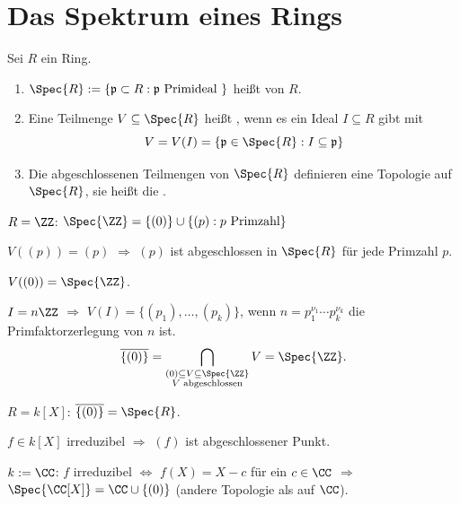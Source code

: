 \section{Das Spektrum eines Rings}

\begin{DefBem}
Sei $R$ ein Ring.

\begin{enumerate}
\item $\Spec{R} := \{ \mathfrak{p} \subset R : \mathfrak{p} \text{ Primideal } \}$ hei\ss t  von $R$.

\item Eine Teilmenge $V \subseteq \Spec{R}$ hei\ss t , wenn es ein Ideal $I \subseteq R$ gibt mit
$$V = V(I) = \{ \mathfrak{p} \in \Spec{R} : I \subseteq \mathfrak{p} \}$$

\item Die abgeschlossenen Teilmengen von $\Spec{R}$ definieren eine Topologie auf $\Spec{R}$, sie hei\ss t die .
\end{enumerate}
\end{DefBem}

\begin{nnBsp}
$R = \ZZ$: $\Spec{\ZZ} = \{ (0) \} \cup \{ (p) : p \text{ Primzahl} \}$

$V( (p) ) = (p)$ $\Rightarrow$ $(p)$ ist abgeschlossen in $\Spec{R}$ f\"ur jede Primzahl $p$.

$V( (0) ) = \Spec{\ZZ}$.

$I = n \ZZ$ $\Rightarrow$ $V(I) = \{ (p_1), \ldots, (p_k) \}$, wenn $n = p_1^{\nu_1} \cdots p_k^{\nu_k}$ die Primfaktorzerlegung von $n$ ist.
\[
\overline{ \{ (0) \} } = \bigcap_{\substack{(0)\subseteq V\subseteq \Spec{\ZZ}\\ V
\text{ abgeschlossen}}} V = \Spec{\ZZ}.
\]
\bigskip

$R = k[X]$: $\overline{ \{ (0) \} } = \Spec{R}$.

$f \in k[X]$ irreduzibel $\Rightarrow$ $(f)$ ist abgeschlossener Punkt.

$k := \CC$: $f$ irreduzibel $\Leftrightarrow$ $f(X) = X - c$ f\"ur ein $c \in
\CC$ $\Rightarrow$ $\Spec{\CC[X]} = \CC \cup \{ (0) \}$ (andere Topologie als
auf $\CC$).

\end{nnBsp}

